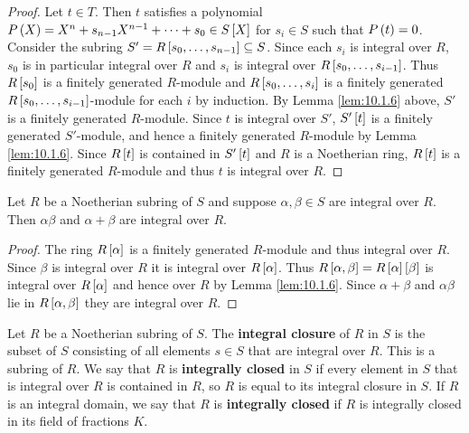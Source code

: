 \begin{proof}
Let $ t \in T $. Then $ t $ satisfies a polynomial $ P\br{X} = X^n + s_{n - 1}X^{n - 1} + \dots + s_0 \in S\sbr{X} $ for $ s_i \in S $ such that $ P\br{t} = 0 $. Consider the subring $ S' = R\sbr{s_0, \dots, s_{n - 1}} \subseteq S $. Since each $ s_i $ is integral over $ R $, $ s_0 $ is in particular integral over $ R $ and $ s_i $ is integral over $ R\sbr{s_0, \dots, s_{i - 1}} $. Thus $ R\sbr{s_0} $ is a finitely generated $ R $-module and $ R\sbr{s_0, \dots, s_i} $ is a finitely generated $ R\sbr{s_0, \dots, s_{i - 1}} $-module for each $ i $ by induction. By Lemma \ref{lem:10.1.6} above, $ S' $ is a finitely generated $ R $-module. Since $ t $ is integral over $ S' $, $ S'\sbr{t} $ is a finitely generated $ S' $-module, and hence a finitely generated $ R $-module by Lemma \ref{lem:10.1.6}. Since $ R\sbr{t} $ is contained in $ S'\sbr{t} $ and $ R $ is a Noetherian ring, $ R\sbr{t} $ is a finitely generated $ R $-module and thus $ t $ is integral over $ R $.
\end{proof}

\begin{corollary}
Let $ R $ be a Noetherian subring of $ S $ and suppose $ \alpha, \beta \in S $ are integral over $ R $. Then $ \alpha\beta $ and $ \alpha + \beta $ are integral over $ R $.
\end{corollary}

\begin{proof}
The ring $ R\sbr{\alpha} $ is a finitely generated $ R $-module and thus integral over $ R $. Since $ \beta $ is integral over $ R $ it is integral over $ R\sbr{\alpha} $. Thus $ R\sbr{\alpha, \beta} = R\sbr{\alpha}\sbr{\beta} $ is integral over $ R\sbr{\alpha} $ and hence over $ R $ by Lemma \ref{lem:10.1.6}. Since $ \alpha + \beta $ and $ \alpha\beta $ lie in $ R\sbr{\alpha, \beta} $ they are integral over $ R $.
\end{proof}

\pagebreak

\begin{definition}
Let $ R $ be a Noetherian subring of $ S $. The \textbf{integral closure} of $ R $ in $ S $ is the subset of $ S $ consisting of all elements $ s \in S $ that are integral over $ R $. This is a subring of $ R $. We say that $ R $ is \textbf{integrally closed} in $ S $ if every element in $ S $ that is integral over $ R $ is contained in $ R $, so $ R $ is equal to its integral closure in $ S $. If $ R $ is an integral domain, we say that $ R $ is \textbf{integrally closed} if $ R $ is integrally closed in its field of fractions $ K $.
\end{definition}

